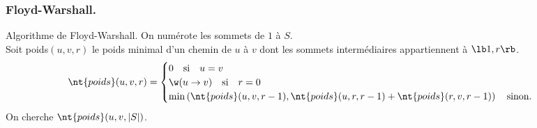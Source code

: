 \documentclass[french, 11pt]{article}
\begin{document}
\subsubsection{Floyd-Warshall.}

\begin{defi}{Algorithme de Floyd-Warshall.}{}
    On numérote les sommets de $1$ à $S$.\\
    Soit poids$(u,v,r)$ le poids minimal d'un chemin de $u$ à $v$ dont les sommets intermédiaires appartiennent à $\lb1,r\rb$.
    \begin{equation*}
        \nt{poids}(u,v,r) = \begin{cases}
            0 \quad \text{si} \quad u=v\\
            \w(u\to v) \quad \text{si} \quad r=0\\
            \min\left(\nt{poids}(u,v,r-1),\nt{poids}(u,r,r-1)+\nt{poids}(r,v,r-1)\right) \quad \text{sinon}.
        \end{cases}
    \end{equation*}
    On cherche $\nt{poids}(u,v,|S|)$.\n
     \begin{algorithm}[H]
        \caption{Algorithme de Floyd-Warshall.}
    \end{algorithm}

\end{defi}
\end{document}
